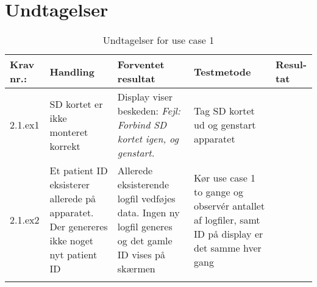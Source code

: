 		\section*{Undtagelser}
			\begin{longtable}{|p{}|p{0.23\textwidth}|p{}|p{}|p{}|}
				\hline
				\rowcolor{usDef}
				Krav nr.: & Handling & Forventet resultat & Testmetode & Resul-tat  \\\hline
				2.1.ex1 & SD kortet er ikke monteret korrekt & Display viser beskeden: \textit{Fejl: Forbind SD kortet igen, og genstart.}  & Tag SD kortet ud og genstart apparatet & \\
				\hline
				2.1.ex2 & Et patient ID eksisterer allerede på apparatet. Der genereres ikke noget nyt patient ID & Allerede eksisterende logfil vedføjes data. Ingen ny logfil generes og det gamle ID vises på skærmen & Kør use case 1 to gange og observér antallet af logfiler, samt ID på display er det samme hver gang &  \\
				 \hline
				\caption{Undtagelser for use case 1}
			\end{longtable}
